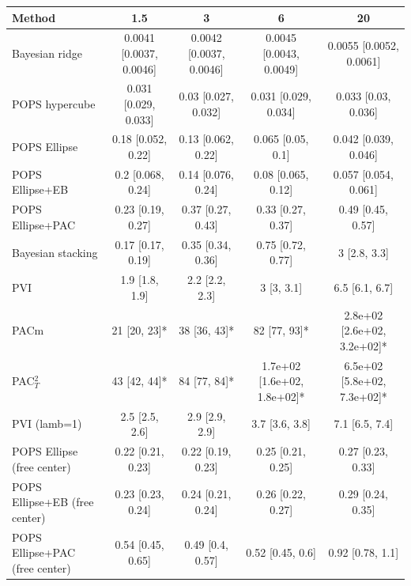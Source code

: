 \begin{tabular}{lcccc}
\toprule
Method & 1.5 & 3 & 6 & 20 \\
\midrule
Bayesian ridge & 0.0041 {\scriptsize[0.0037, 0.0046]} & 0.0042 {\scriptsize[0.0037, 0.0046]} & 0.0045 {\scriptsize[0.0043, 0.0049]} & 0.0055 {\scriptsize[0.0052, 0.0061]} \\
POPS hypercube & 0.031 {\scriptsize[0.029, 0.033]} & 0.03 {\scriptsize[0.027, 0.032]} & 0.031 {\scriptsize[0.029, 0.034]} & 0.033 {\scriptsize[0.03, 0.036]} \\
POPS Ellipse & 0.18 {\scriptsize[0.052, 0.22]} & 0.13 {\scriptsize[0.062, 0.22]} & 0.065 {\scriptsize[0.05, 0.1]} & 0.042 {\scriptsize[0.039, 0.046]} \\
POPS Ellipse+EB & 0.2 {\scriptsize[0.068, 0.24]} & 0.14 {\scriptsize[0.076, 0.24]} & 0.08 {\scriptsize[0.065, 0.12]} & 0.057 {\scriptsize[0.054, 0.061]} \\
POPS Ellipse+PAC & 0.23 {\scriptsize[0.19, 0.27]} & 0.37 {\scriptsize[0.27, 0.43]} & 0.33 {\scriptsize[0.27, 0.37]} & 0.49 {\scriptsize[0.45, 0.57]} \\
Bayesian stacking & 0.17 {\scriptsize[0.17, 0.19]} & 0.35 {\scriptsize[0.34, 0.36]} & 0.75 {\scriptsize[0.72, 0.77]} & 3 {\scriptsize[2.8, 3.3]} \\
PVI & 1.9 {\scriptsize[1.8, 1.9]} & 2.2 {\scriptsize[2.2, 2.3]} & 3 {\scriptsize[3, 3.1]} & 6.5 {\scriptsize[6.1, 6.7]} \\
PACm & 21 {\scriptsize[20, 23]}* & 38 {\scriptsize[36, 43]}* & 82 {\scriptsize[77, 93]}* & 2.8e+02 {\scriptsize[2.6e+02, 3.2e+02]}* \\
PAC$^2_T$ & 43 {\scriptsize[42, 44]}* & 84 {\scriptsize[77, 84]}* & 1.7e+02 {\scriptsize[1.6e+02, 1.8e+02]}* & 6.5e+02 {\scriptsize[5.8e+02, 7.3e+02]}* \\
PVI (lamb=1) & 2.5 {\scriptsize[2.5, 2.6]} & 2.9 {\scriptsize[2.9, 2.9]} & 3.7 {\scriptsize[3.6, 3.8]} & 7.1 {\scriptsize[6.5, 7.4]} \\
POPS Ellipse (free center) & 0.22 {\scriptsize[0.21, 0.23]} & 0.22 {\scriptsize[0.19, 0.23]} & 0.25 {\scriptsize[0.21, 0.25]} & 0.27 {\scriptsize[0.23, 0.33]} \\
POPS Ellipse+EB (free center) & 0.23 {\scriptsize[0.23, 0.24]} & 0.24 {\scriptsize[0.21, 0.24]} & 0.26 {\scriptsize[0.22, 0.27]} & 0.29 {\scriptsize[0.24, 0.35]} \\
POPS Ellipse+PAC (free center) & 0.54 {\scriptsize[0.45, 0.65]} & 0.49 {\scriptsize[0.4, 0.57]} & 0.52 {\scriptsize[0.45, 0.6]} & 0.92 {\scriptsize[0.78, 1.1]} \\
\bottomrule
\end{tabular}
